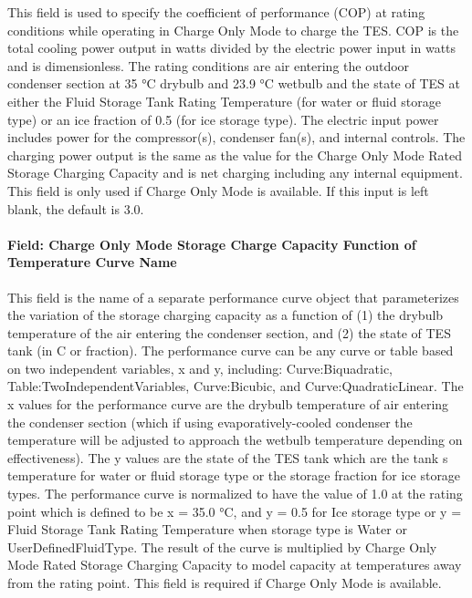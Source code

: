 This field is used to specify the coefficient of performance (COP) at rating conditions while operating in Charge Only Mode to charge the TES. COP is the total cooling power output in watts divided by the electric power input in watts and is dimensionless. The rating conditions are air entering the outdoor condenser section at 35 °C drybulb and 23.9 °C wetbulb and the state of TES at either the Fluid Storage Tank Rating Temperature (for water or fluid storage type) or an ice fraction of 0.5 (for ice storage type). The electric input power includes power for the compressor(s), condenser fan(s), and internal controls. The charging power output is the same as the value for the Charge Only Mode Rated Storage Charging Capacity and is net charging including any internal equipment. This field is only used if Charge Only Mode is available. If this input is left blank, the default is 3.0.

\paragraph{Field: Charge Only Mode Storage Charge Capacity Function of Temperature Curve Name}\label{field-charge-only-mode-storage-charge-capacity-function-of-temperature-curve-name}

This field is the name of a separate performance curve object that parameterizes the variation of the storage charging capacity as a function of (1) the drybulb temperature of the air entering the condenser section, and (2) the state of TES tank (in C or fraction). The performance curve can be any curve or table based on two independent variables, x and y, including: Curve:Biquadratic, Table:TwoIndependentVariables, Curve:Bicubic, and Curve:QuadraticLinear. The x values for the performance curve are the drybulb temperature of air entering the condenser section (which if using evaporatively-cooled condenser the temperature will be adjusted to approach the wetbulb temperature depending on effectiveness). The y values are the state of the TES tank which are the tank s temperature for water or fluid storage type or the storage fraction for ice storage types. The performance curve is normalized to have the value of 1.0 at the rating point which is defined to be x = 35.0 °C, and y = 0.5 for Ice storage type or y = Fluid Storage Tank Rating Temperature when storage type is Water or UserDefinedFluidType. The result of the curve is multiplied by Charge Only Mode Rated Storage Charging Capacity to model capacity at temperatures away from the rating point. This field is required if Charge Only Mode is available.

